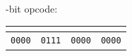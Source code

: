 \documentclass{scrreprt}
\begin{document}
-bit opcode:

\noindent
\begin{tabular}{|c|c|c|c|}
 \multicolumn{4}{|c|}{}\\
\hline
\texttt{0000} & \texttt{0111} & \texttt{0000} & \texttt{0000}\\

\end{tabular}
\vspace{0.1in}

\end{document}
